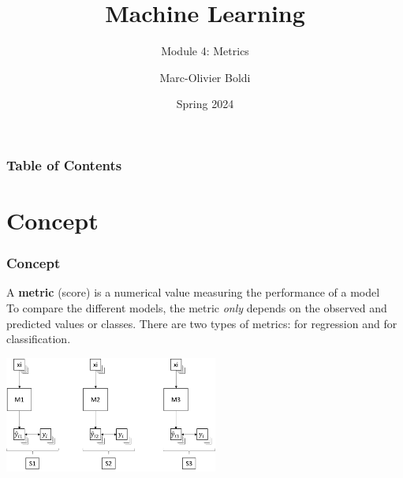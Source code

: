 
\title{Machine Learning}
\subtitle{Module 4: Metrics}
\author[MOB]{Marc-Olivier Boldi}
\date[Spring 2024]{Spring 2024}

\begin{frame}
  \titlepage
\end{frame}
\begin{frame}
\frametitle{Table of Contents}
	\tableofcontents
\end{frame}
\section{Concept}
\begin{frame}
\frametitle{Concept}
A {\bf metric} (score) is a numerical value measuring the performance of a model\\ 
\vspace{0.2cm}
To compare the different models, the metric {\it only} depends on the observed and predicted values or classes. There are two types of metrics: for regression and for classification.
\begin{center}
\includegraphics[width=7cm]{../Graphs/ML3.png}
\end{center}
\end{frame}
